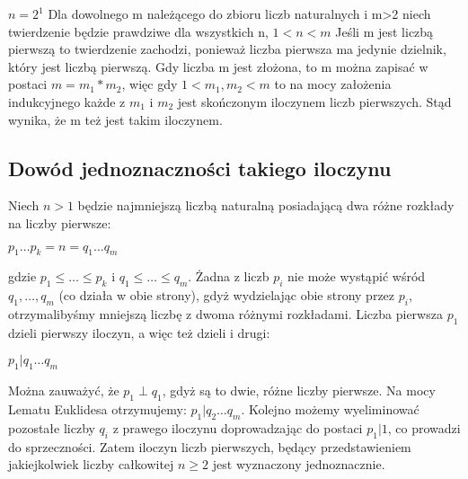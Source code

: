 \documentclass[a4paper, 12pt]{article}
\begin{document}
\(n=2^1\)
\bigbreak
Dla dowolnego m należącego do zbioru liczb naturalnych i m>2 niech twierdzenie będzie prawdziwe dla wszystkich n, \( 1<n<m \)
\bigbreak
Jeśli m jest liczbą pierwszą to twierdzenie zachodzi, ponieważ liczba pierwsza ma jedynie dzielnik, który jest liczbą pierwszą.
\bigbreak
Gdy liczba m jest złożona, to m można zapisać w postaci \(m=m_{1}*m_{2}\), więc gdy \(1<m_{1},m_{2}<m\) to na mocy założenia indukcyjnego każde z \(m_{1}\) i \(m_{2}\) jest skończonym iloczynem liczb pierwszych. Stąd wynika, że m też jest takim iloczynem.
\bigbreak
\subsection{Dowód jednoznaczności takiego iloczynu}
Niech $n>1$ będzie najmniejszą liczbą naturalną posiadającą dwa różne rozkłady na liczby pierwsze:
\begin{center}
    $p_1\ldots p_k=n=q_1\ldots q_m$
\end{center}
gdzie $p_1\leq\ldots\leq p_k$ i $q_1\leq\ldots\leq q_m$.
\bigbreak
Żadna z liczb $p_i$ nie może wystąpić wśród $q_1,\ldots,q_m$ (co działa w obie strony), gdyż wydzielając obie strony przez $p_i$,
otrzymalibyśmy mniejszą liczbę z dwoma różnymi rozkładami.
\bigbreak
Liczba pierwsza $p_1$ dzieli pierwszy iloczyn, a więc też dzieli i drugi:
\begin{center}
    $p_1|q_1\ldots q_m$
\end{center}
Można zauważyć, że $p_1\perp q_1$, gdyż są to dwie, różne liczby pierwsze.
\bigbreak
Na mocy Lematu Euklidesa otrzymujemy: $p_1|q_2\ldots q_m$.
Kolejno możemy wyeliminować pozostałe liczby $q_i$ z prawego iloczynu doprowadzając do postaci $p_1|1$, co prowadzi do sprzeczności.
\bigbreak
Zatem iloczyn liczb pierwszych, będący przedstawieniem jakiejkolwiek liczby całkowitej \(n \geq 2 \) jest wyznaczony jednoznacznie.
\end{document}
